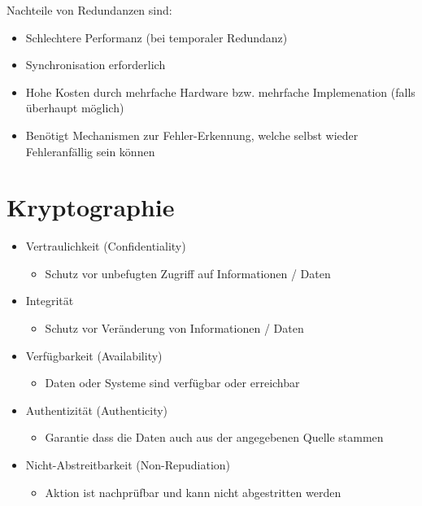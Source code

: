 \documentclass[a4paper,12pt,leqno]{article}
\begin{document}
Nachteile von Redundanzen sind:
\begin{itemize}
\item Schlechtere Performanz (bei temporaler Redundanz)
\item Synchronisation erforderlich
\item Hohe Kosten durch mehrfache Hardware bzw. mehrfache Implemenation (falls überhaupt möglich)
\item Benötigt Mechanismen zur Fehler-Erkennung, welche selbst wieder Fehleranfällig sein können
\end{itemize}

\section{Kryptographie}
\begin{itemize}
\label{item:schutzziele}
\item Vertraulichkeit (Confidentiality)
	\begin{itemize}
	\item Schutz vor unbefugten Zugriff auf Informationen / Daten
	\end{itemize}
\item Integrität
	\begin{itemize}
	\item Schutz vor Veränderung von Informationen / Daten
	\end{itemize}
\item Verfügbarkeit (Availability)
	\begin{itemize}
	\item Daten oder Systeme sind verfügbar oder erreichbar
	\end{itemize}
\item Authentizität (Authenticity)
	\begin{itemize}
	\item Garantie dass die Daten auch aus der angegebenen Quelle stammen
	\end{itemize}
\item Nicht-Abstreitbarkeit (Non-Repudiation)
	\begin{itemize}
	\item Aktion ist nachprüfbar und kann nicht abgestritten werden
	\end{itemize}
\end{itemize}
\end{document}
